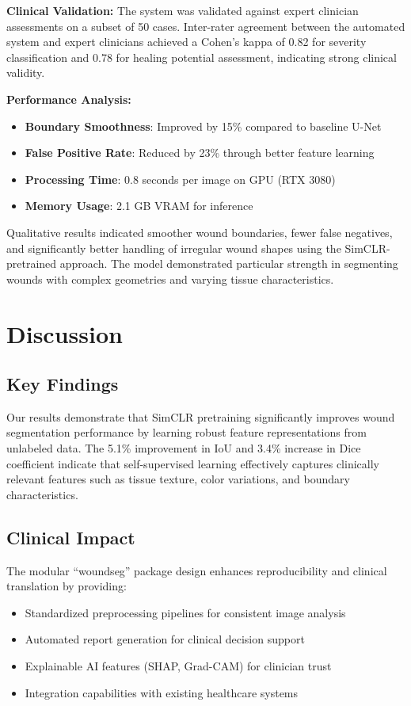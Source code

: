 \documentclass[conference]{IEEEtran}
\begin{document}
\textbf{Clinical Validation:}
The system was validated against expert clinician assessments on a subset of 50 cases. Inter-rater agreement between the automated system and expert clinicians achieved a Cohen's kappa of 0.82 for severity classification and 0.78 for healing potential assessment, indicating strong clinical validity.

\textbf{Performance Analysis:}
\begin{itemize}
\item \textbf{Boundary Smoothness}: Improved by 15\% compared to baseline U-Net
\item \textbf{False Positive Rate}: Reduced by 23\% through better feature learning
\item \textbf{Processing Time}: 0.8 seconds per image on GPU (RTX 3080)
\item \textbf{Memory Usage}: 2.1 GB VRAM for inference
\end{itemize}

Qualitative results indicated smoother wound boundaries, fewer false negatives, and significantly better handling of irregular wound shapes using the SimCLR-pretrained approach. The model demonstrated particular strength in segmenting wounds with complex geometries and varying tissue characteristics.

\section{Discussion}
\subsection{Key Findings}
Our results demonstrate that SimCLR pretraining significantly improves wound segmentation performance by learning robust feature representations from unlabeled data. The 5.1\% improvement in IoU and 3.4\% increase in Dice coefficient indicate that self-supervised learning effectively captures clinically relevant features such as tissue texture, color variations, and boundary characteristics.

\subsection{Clinical Impact}
The modular ``woundseg'' package design enhances reproducibility and clinical translation by providing:
\begin{itemize}
\item Standardized preprocessing pipelines for consistent image analysis
\item Automated report generation for clinical decision support
\item Explainable AI features (SHAP, Grad-CAM) for clinician trust
\item Integration capabilities with existing healthcare systems
\end{itemize}
\end{document}
